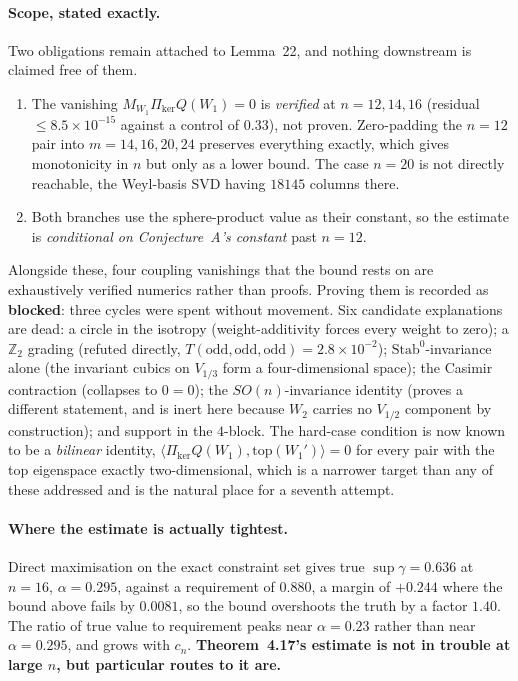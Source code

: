 \paragraph{Scope, stated exactly.} Two obligations remain attached to Lemma~22, and nothing downstream is claimed free of them.
\begin{enumerate}[nosep,leftmargin=1.6em]
\item The vanishing $M_{W_1}\Pi_{\ker}Q(W_1)=0$ is \emph{verified} at $n=12,14,16$ (residual $\le8.5\times10^{-15}$ against a control of $0.33$), not proven. Zero-padding the $n=12$ pair into $m=14,16,20,24$ preserves everything exactly, which gives monotonicity in $n$ but only as a lower bound. The case $n=20$ is not directly reachable, the Weyl-basis SVD having $18145$ columns there.
\item Both branches use the sphere-product value as their constant, so the estimate is \emph{conditional on Conjecture~A's constant} past $n=12$.
\end{enumerate}
Alongside these, four coupling vanishings that the bound rests on are exhaustively verified numerics rather than proofs. Proving them is recorded as \textbf{blocked}: three cycles were spent without movement. Six candidate explanations are dead: a circle in the isotropy (weight-additivity forces every weight to zero); a $\mathbb Z_2$ grading (refuted directly, $T(\mathrm{odd},\mathrm{odd},\mathrm{odd})=2.8\times10^{-2}$); $\mathrm{Stab}^0$-invariance alone (the invariant cubics on $V_{1/3}$ form a four-dimensional space); the Casimir contraction (collapses to $0=0$); the $SO(n)$-invariance identity (proves a different statement, and is inert here because $W_2$ carries no $V_{1/2}$ component by construction); and support in the $4$-block. The hard-case condition is now known to be a \emph{bilinear} identity, $\langle\Pi_{\ker}Q(W_1),\mathrm{top}(W_1')\rangle=0$ for every pair with the top eigenspace exactly two-dimensional, which is a narrower target than any of these addressed and is the natural place for a seventh attempt.

\paragraph{Where the estimate is actually tightest.} Direct maximisation on the exact constraint set gives true $\sup\gamma=0.636$ at $n=16$, $\alpha=0.295$, against a requirement of $0.880$, a margin of $+0.244$ where the bound above fails by $0.0081$, so the bound overshoots the truth by a factor $1.40$. The ratio of true value to requirement peaks near $\alpha=0.23$ rather than near $\alpha=0.295$, and grows with $c_n$. \textbf{Theorem~4.17's estimate is not in trouble at large $n$, but particular routes to it are.}

